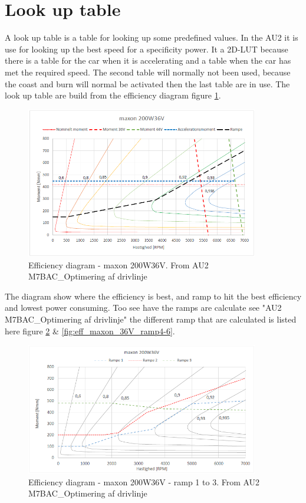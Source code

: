 \newpage
\section{Look up table}

A look up table is a table for looking up some predefined values. In the AU2 it is use for looking up the best speed for a specificity power. It a 2D-LUT because there is a table for the car when it is accelerating and a table when the car has met the required speed. The second table will normally not been used, because the coast and burn will normal be activated then the last table are in use. The look up table are build from the efficiency diagram figure \ref{fig:eff_maxon_36V}. 

\begin{figure}[H]
	\centering
	\includegraphics [width=4in]{Software/Pictures/maxon-200W36V.PNG}
	\caption{Efficiency diagram - maxon 200W36V. From AU2 M7BAC\_Optimering af drivlinje}
	\label{fig:eff_maxon_36V}
\end{figure}

The diagram show where the efficiency is best, and ramp to hit the best efficiency and lowest power consuming. Too see have the ramps are calculate see "AU2 M7BAC\_Optimering af drivlinje" the different ramp that are calculated is listed here figure \ref{fig:eff_maxon_36V_ramp1-3} \& \ref{fig:eff_maxon_36V_ramp4-6}.

\begin{figure}[H]
	\centering
	\includegraphics [width=4in]{Software/Pictures/Momentramper-1-3.PNG}
	\caption{Efficiency diagram - maxon 200W36V - ramp 1 to 3. From AU2 M7BAC\_Optimering af drivlinje}
	\label{fig:eff_maxon_36V_ramp1-3}
\end{figure}

